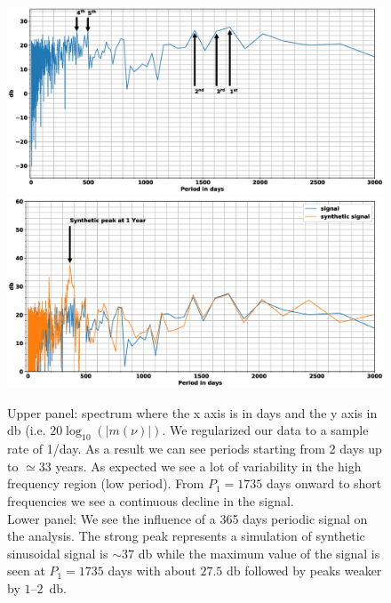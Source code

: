 \documentclass[twocolumn]{aastex62}
\begin{document}
%
\begin{figure}
\includegraphics[width=1\textwidth]{spec.eps}
\includegraphics[width=1\textwidth]{spec_synth.eps}
\caption{Upper panel: spectrum where the x axis is in days and the y axis in db (i.e. $20\log_{10}\left( \left| m(\nu) \right| \right)$.  We regularized our data to a sample rate of 1/day. As a result we can see periods starting from 2 days up to $\simeq 33$ years. As expected we see a lot of variability in the high frequency region (low period). From $P_1=1735$ days onward to short frequencies we see a continuous decline in the signal.\\
Lower panel: We see the influence of a 365 days periodic signal on the analysis. The strong peak represents a simulation of synthetic sinusoidal signal is $\sim37$ db while the maximum value of the signal is seen at $P_1=1735$ days with about $27.5$ db followed by peaks weaker by $1$--$2$~db.
}
\label{fig:spec}
\end{figure}
\end{document}
